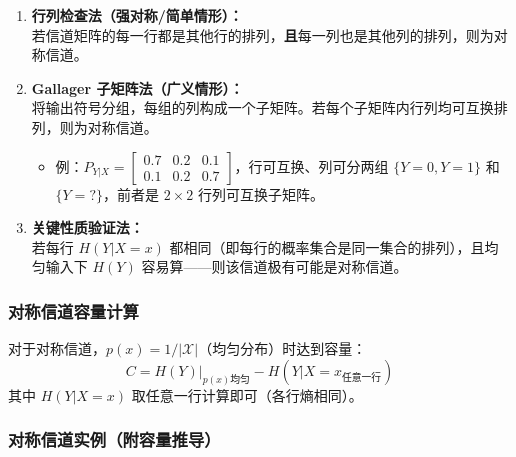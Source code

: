 \documentclass[12pt,a4paper]{ctexart}
\theoremstyle{definition}
\newcommand{\XX}{\mathcal{X}}
\begin{document}
\begin{enumerate}[label=\textbf{方法\arabic*：}, leftmargin=*]
  \item \textbf{行列检查法（强对称/简单情形）：}\\
  若信道矩阵的每一行都是其他行的排列，\textbf{且}每一列也是其他列的排列，则为对称信道。

  \item \textbf{Gallager 子矩阵法（广义情形）：}\\
  将输出符号分组，每组的列构成一个子矩阵。若每个子矩阵内行列均可互换排列，则为对称信道。
  \begin{itemize}[nosep]
    \item 例：$P_{Y|X} = \begin{bmatrix} 0.7 & 0.2 & 0.1 \\ 0.1 & 0.2 & 0.7 \end{bmatrix}$，行可互换、列可分两组 $\{Y=0,Y=1\}$ 和 $\{Y=?\}$，前者是 $2\times2$ 行列可互换子矩阵。
  \end{itemize}

  \item \textbf{关键性质验证法：}\\
  若每行 $H(Y|X=x)$ 都相同（即每行的概率集合是同一集合的排列），且均匀输入下 $H(Y)$ 容易算——则该信道极有可能是对称信道。
\end{enumerate}

\subsubsection{对称信道容量计算}

对于对称信道，$p(x) = 1/|\XX|$（均匀分布）时达到容量：
\[
C = H(Y)\big|_{p(x)\text{均匀}} - H(Y|X=x_{\text{任意一行}})
\]
其中 $H(Y|X=x)$ 取任意一行计算即可（各行熵相同）。

\subsubsection{对称信道实例（附容量推导）}
\end{document}
